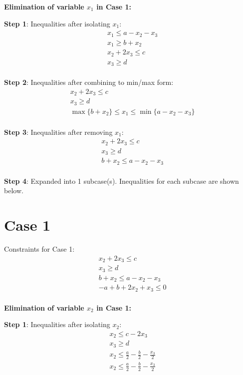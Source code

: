\documentclass{article}
\begin{document}
\textbf{Elimination of variable $x_{1}$ in Case 1:}

\textbf{Step 1}: Inequalities after isolating $x_{1}$:
\begin{align}
& x_{1} \leq a - x_{2} - x_{3} \\
& x_{1} \geq b + x_{2} \\
& x_{2} + 2 x_{3} \leq c \\
& x_{3} \geq d \\
\end{align}

\textbf{Step 2}: Inequalities after combining to min/max form:
\begin{align}
& x_{2} + 2 x_{3} \leq c \\
& x_{3} \geq d \\
& \max\{b + x_{2}\} \leq x_{1} \leq \min\{a - x_{2} - x_{3}\} \\
\end{align}

\textbf{Step 3}: Inequalities after removing $x_{1}$:
\begin{align}
& x_{2} + 2 x_{3} \leq c \\
& x_{3} \geq d \\
& b + x_{2} \leq a - x_{2} - x_{3} \\
\end{align}

\textbf{Step 4}: Expanded into 1 subcase(s). Inequalities for each subcase are shown below.

\section{Case 1}

Constraints for Case 1:
\begin{align}
& x_{2} + 2 x_{3} \leq c \\
& x_{3} \geq d \\
& b + x_{2} \leq a - x_{2} - x_{3} \\
& - a + b + 2 x_{2} + x_{3} \leq 0 \\
\end{align}

\textbf{Elimination of variable $x_{2}$ in Case 1:}

\textbf{Step 1}: Inequalities after isolating $x_{2}$:
\begin{align}
& x_{2} \leq c - 2 x_{3} \\
& x_{3} \geq d \\
& x_{2} \leq \frac{a}{2} - \frac{b}{2} - \frac{x_{3}}{2} \\
& x_{2} \leq \frac{a}{2} - \frac{b}{2} - \frac{x_{3}}{2} \\
\end{align}
\end{document}
